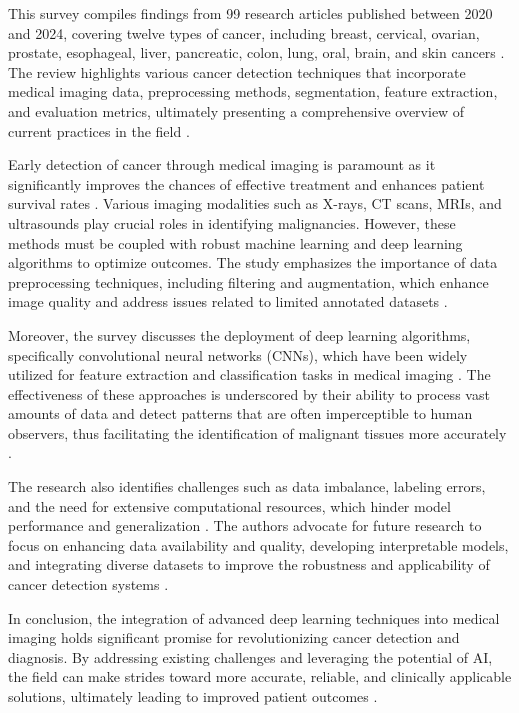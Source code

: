 \documentclass[runningheads]{llncs}
\begin{document}
This survey compiles findings from 99 research articles published between 2020 and 2024, covering twelve types of cancer, including breast, cervical, ovarian, prostate, esophageal, liver, pancreatic, colon, lung, oral, brain, and skin cancers \cite{Istiak_2024}. The review highlights various cancer detection techniques that incorporate medical imaging data, preprocessing methods, segmentation, feature extraction, and evaluation metrics, ultimately presenting a comprehensive overview of current practices in the field \cite{Istiak_2024}. 

Early detection of cancer through medical imaging is paramount as it significantly improves the chances of effective treatment and enhances patient survival rates \cite{Istiak_2024}. Various imaging modalities such as X-rays, CT scans, MRIs, and ultrasounds play crucial roles in identifying malignancies. However, these methods must be coupled with robust machine learning and deep learning algorithms to optimize outcomes. The study emphasizes the importance of data preprocessing techniques, including filtering and augmentation, which enhance image quality and address issues related to limited annotated datasets \cite{Istiak_2024}.

Moreover, the survey discusses the deployment of deep learning algorithms, specifically convolutional neural networks (CNNs), which have been widely utilized for feature extraction and classification tasks in medical imaging \cite{Istiak_2024}. The effectiveness of these approaches is underscored by their ability to process vast amounts of data and detect patterns that are often imperceptible to human observers, thus facilitating the identification of malignant tissues more accurately \cite{Istiak_2024}.

The research also identifies challenges such as data imbalance, labeling errors, and the need for extensive computational resources, which hinder model performance and generalization \cite{Istiak_2024}. The authors advocate for future research to focus on enhancing data availability and quality, developing interpretable models, and integrating diverse datasets to improve the robustness and applicability of cancer detection systems \cite{Istiak_2024}. 

In conclusion, the integration of advanced deep learning techniques into medical imaging holds significant promise for revolutionizing cancer detection and diagnosis. By addressing existing challenges and leveraging the potential of AI, the field can make strides toward more accurate, reliable, and clinically applicable solutions, ultimately leading to improved patient outcomes \cite{Istiak_2024}.
\end{document}
